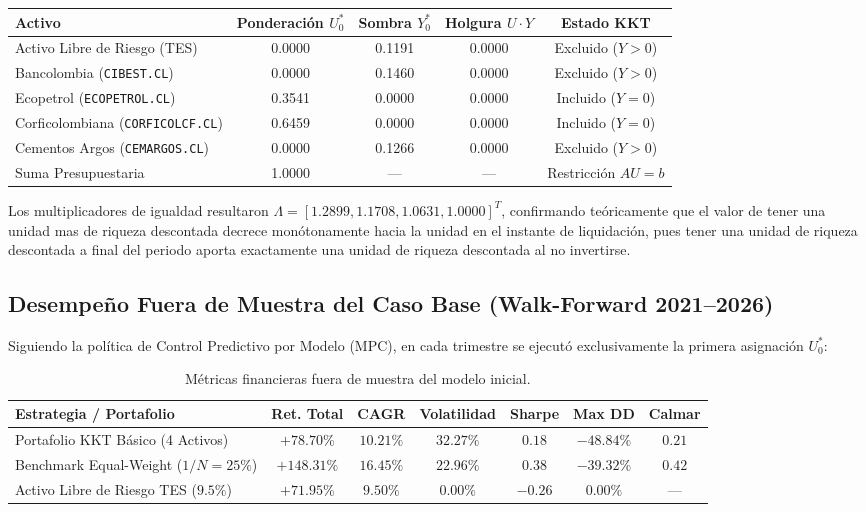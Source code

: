 \documentclass[11pt,a4paper]{article}
\begin{document}
\begin{table}[htbp]
\centering
\footnotesize
\setlength{\tabcolsep}{5pt}
\begin{tabular}{lcccc}
\toprule
Activo & Ponderación $U_0^*$ & Sombra $Y_0^*$ & Holgura $U \cdot Y$ & Estado KKT \\
\midrule
Activo Libre de Riesgo (TES) & 0.0000 & 0.1191 & 0.0000 & Excluido ($Y > 0$) \\
Bancolombia (\texttt{CIBEST.CL}) & 0.0000 & 0.1460 & 0.0000 & Excluido ($Y > 0$) \\
Ecopetrol (\texttt{ECOPETROL.CL}) & 0.3541 & 0.0000 & 0.0000 & Incluido ($Y = 0$) \\
Corficolombiana (\texttt{CORFICOLCF.CL}) & 0.6459 & 0.0000 & 0.0000 & Incluido ($Y = 0$) \\
Cementos Argos (\texttt{CEMARGOS.CL}) & 0.0000 & 0.1266 & 0.0000 & Excluido ($Y > 0$) \\
\midrule
Suma Presupuestaria & 1.0000 & --- & --- & Restricción $AU=b$ \\
\bottomrule
\end{tabular}
\end{table}

Los multiplicadores de igualdad resultaron $\Lambda = [1.2899, 1.1708, 1.0631, 1.0000]^T$, confirmando teóricamente que el valor de tener una unidad mas de riqueza descontada decrece monótonamente hacia la unidad en el instante de liquidación, pues tener una unidad de riqueza descontada a final del periodo aporta exactamente una unidad de riqueza descontada al no invertirse.

\subsection{Desempeño Fuera de Muestra del Caso Base (Walk-Forward 2021--2026)}
Siguiendo la política de Control Predictivo por Modelo (MPC), en cada trimestre se ejecutó exclusivamente la primera asignación $U_0^*$:

\begin{table}[htbp]
\centering
\footnotesize
\setlength{\tabcolsep}{4pt}
\begin{tabular}{lcccccc}
\toprule
Estrategia / Portafolio & Ret. Total & CAGR & Volatilidad & Sharpe & Max DD & Calmar \\
\midrule
Portafolio KKT Básico (4 Activos) & $+78.70\%$ & $10.21\%$ & $32.27\%$ & $0.18$ & $-48.84\%$ & $0.21$ \\
Benchmark Equal-Weight ($1/N = 25\%$) & $+148.31\%$ & $16.45\%$ & $22.96\%$ & $0.38$ & $-39.32\%$ & $0.42$ \\
Activo Libre de Riesgo TES ($9.5\%$) & $+71.95\%$ & $9.50\%$ & $0.00\%$ & $-0.26$ & $0.00\%$ & --- \\
\bottomrule
\end{tabular}
\caption{Métricas financieras fuera de muestra del modelo inicial.}
\end{table}
\end{document}
